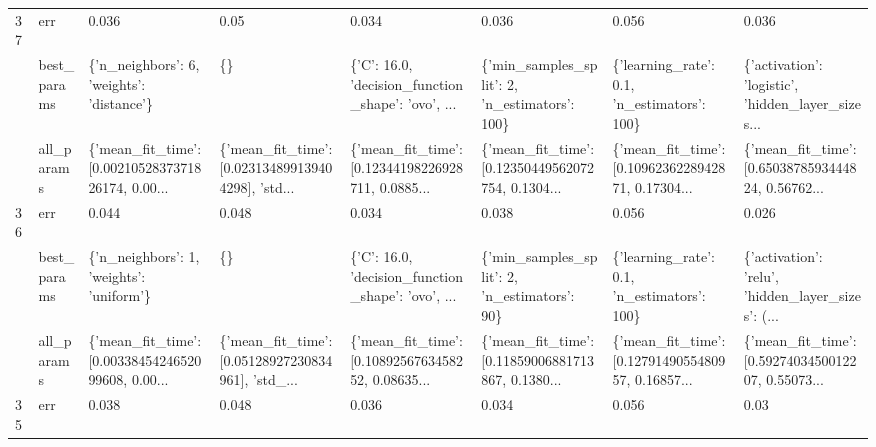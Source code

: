 \begin{tabular}{llllllll}
37 & err &                                              0.036 &                                               0.05 &                                              0.034 &                                              0.036 &                                              0.056 &                                              0.036 \\
   & best\_params &          \{'n\_neighbors': 6, 'weights': 'distance'\} &                                                 \{\} &  \{'C': 16.0, 'decision\_function\_shape': 'ovo', ... &      \{'min\_samples\_split': 2, 'n\_estimators': 100\} &        \{'learning\_rate': 0.1, 'n\_estimators': 100\} &  \{'activation': 'logistic', 'hidden\_layer\_sizes... \\
   & all\_params &  \{'mean\_fit\_time': [0.0021052837371826174, 0.00... &  \{'mean\_fit\_time': [0.023134899139404298], 'std... &  \{'mean\_fit\_time': [0.12344198226928711, 0.0885... &  \{'mean\_fit\_time': [0.12350449562072754, 0.1304... &  \{'mean\_fit\_time': [0.1096236228942871, 0.17304... &  \{'mean\_fit\_time': [0.6503878593444824, 0.56762... \\
36 & err &                                              0.044 &                                              0.048 &                                              0.034 &                                              0.038 &                                              0.056 &                                              0.026 \\
   & best\_params &           \{'n\_neighbors': 1, 'weights': 'uniform'\} &                                                 \{\} &  \{'C': 16.0, 'decision\_function\_shape': 'ovo', ... &       \{'min\_samples\_split': 2, 'n\_estimators': 90\} &        \{'learning\_rate': 0.1, 'n\_estimators': 100\} &  \{'activation': 'relu', 'hidden\_layer\_sizes': (... \\
   & all\_params &  \{'mean\_fit\_time': [0.0033845424652099608, 0.00... &  \{'mean\_fit\_time': [0.05128927230834961], 'std\_... &  \{'mean\_fit\_time': [0.1089256763458252, 0.08635... &  \{'mean\_fit\_time': [0.11859006881713867, 0.1380... &  \{'mean\_fit\_time': [0.1279149055480957, 0.16857... &  \{'mean\_fit\_time': [0.5927403450012207, 0.55073... \\
35 & err &                                              0.038 &                                              0.048 &                                              0.036 &                                              0.034 &                                              0.056 &                                               0.03 \\

\end{tabular}
